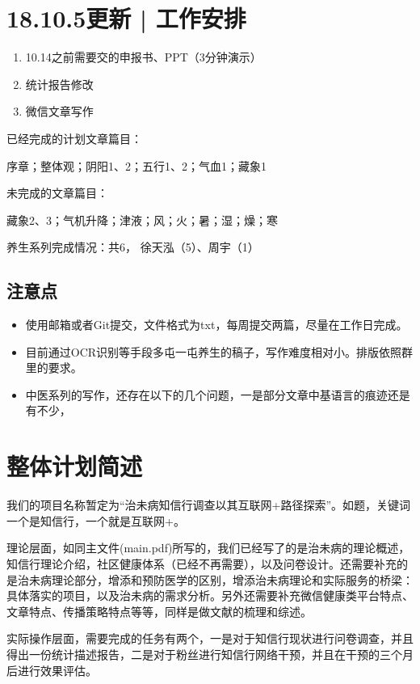 \documentclass{article}
\begin{document}
    \section*{18.10.5更新 | 工作安排}
    \begin{enumerate}
        \item 10.14之前需要交的申报书、PPT（3分钟演示）
        \item 统计报告修改
        \item 微信文章写作
    \end{enumerate}

    已经完成的计划文章篇目：
    
    序章；整体观；阴阳1、2；五行1、2；气血1；藏象1
    
    未完成的文章篇目：
    
    藏象2、3；气机升降；津液；风；火；暑；湿；燥；寒
    
    养生系列完成情况：共6， 徐天泓（5）、周宇（1）
    \subsection{注意点}
    \begin{itemize}
        \item 使用邮箱或者Git提交，文件格式为txt，每周提交两篇，尽量在工作日完成。
        \item 目前通过OCR识别等手段多屯一屯养生的稿子，写作难度相对小。排版依照群里的要求。
        \item 中医系列的写作，还存在以下的几个问题，一是部分文章中基语言的痕迹还是有不少，
    \end{itemize}
    \section{整体计划简述}
    我们的项目名称暂定为“治未病知信行调查以其互联网+路径探索”。如题，关键词一个是知信行，一个就是互联网+。
    
    理论层面，如同主文件(main.pdf)所写的，我们已经写了的是治未病的理论概述，知信行理论介绍，社区健康体系（已经不再需要），以及问卷设计。还需要补充的是治未病理论部分，增添和预防医学的区别，增添治未病理论和实际服务的桥梁：具体落实的项目，以及治未病的需求分析。另外还需要补充微信健康类平台特点、文章特点、传播策略特点等等，同样是做文献的梳理和综述。
    
    实际操作层面，需要完成的任务有两个，一是对于知信行现状进行问卷调查，并且得出一份统计描述报告，二是对于粉丝进行知信行网络干预，并且在干预的三个月后进行效果评估。
    
\end{document}
